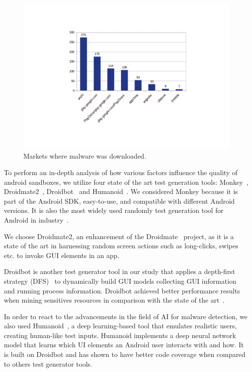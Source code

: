 \begin{figure}[ht]
\centering
\includegraphics[scale=0.32]{images/stores.pdf}
\caption{Markets where malware was downloaded.}
 \label{fig:stores}
\end{figure}

To perform an in-depth analysis of how various factors influence the quality of android sandboxes, we utilize four state of the art test generation tools: Monkey~\cite{Monkey}, Droidmate2~\cite{DBLP:conf/kbse/BorgesHZ18}, Droidbot~\cite{DBLP:conf/icse/LiYGC17} and Humanoid~\cite{DBLP:conf/kbse/LiY0C19}. We considered Monkey because it is part of the Android SDK, easy-to-use, and compatible with different Android versions. It is also the most widely used randomly test generation tool for Android in industry~\cite{DBLP:conf/sigsoft/ZengLZXDLYX16}. 

We choose Droidmate2, an enhancement of the Droidmate~\cite{DBLP:conf/icse/JamrozikZ16} project, as it is a state of the art in harnessing random screen actions such as long-clicks, swipes etc. to invoke GUI elements in an app. 

Droidbot is another test generator tool in our study that applies a depth-first strategy (DFS)~\cite{DBLP:conf/oopsla/AzimN13} to dynamically build  GUI models collecting GUI information and running process
information. Droidbot achieved better performance results when mining sensitives resources in comparison with the state of the art\cite{DBLP:conf/wcre/BaoLL18}~\cite{DBLP:journals/jss/CostaMMSSBNR22}. 

In order to react to the advancements in the field of AI for malware detection, we also used Humanoid~\cite{DBLP:conf/kbse/LiY0C19}, a deep learning-based tool that emulates realistic users, creating human-like test inputs. Humanoid implements a deep neural network model that learns which UI elements an Android user interacts with and how. It is built on Droidbot and has shown to have better code coverage when compared to others test generator tools.


